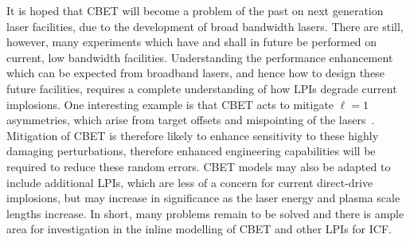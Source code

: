 It is hoped that \ac{CBET} will become a problem of the past on next generation laser facilities, due to the development of broad bandwidth lasers.
There are still, however, many experiments which have and shall in future be performed on current, low bandwidth facilities.
Understanding the performance enhancement which can be expected from broadband lasers, and hence how to design these future facilities, requires a complete understanding of how \ac{LPIs} degrade current implosions.
One interesting example is that \ac{CBET} acts to mitigate $\ell=1$ asymmetries, which arise from target offsets and mispointing of the lasers~\cite{anderson_effect_2020}.
Mitigation of \ac{CBET} is therefore likely to enhance sensitivity to these highly damaging perturbations, therefore enhanced engineering capabilities will be required to reduce these random errors.
\ac{CBET} models may also be adapted to include additional \ac{LPIs}, which are less of a concern for current direct-drive implosions, but may increase in significance as the laser energy and plasma scale lengths increase.
In short, many problems remain to be solved and there is ample area for investigation in the inline modelling of \ac{CBET} and other \ac{LPIs} for \ac{ICF}.
